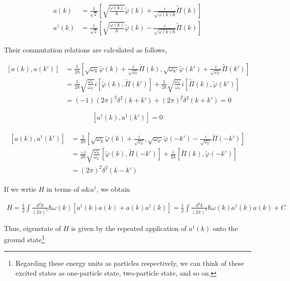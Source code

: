 \begin{align}\label{1.4.8}
\begin{split}
a(k) &= \frac{1}{\sqrt{2}}\left[\sqrt{\frac{\omega(k)}{\hbar}}\tilde{\varphi}(k)+\frac{i}{\sqrt{\omega(k)\hbar}}\tilde{\Pi}(k)\right]\\
a^\dagger(k) &= \frac{1}{\sqrt{2}}\left[\sqrt{\frac{\omega(k)}{\hbar}}\tilde{\varphi}(k)-\frac{i}{\sqrt{\omega(k)\hbar}}\tilde{\Pi}(k)\right]
\end{split}
\end{align}

Their commutation relations are calculated as follows, 

\[\begin{split}
[a(k),a(k')] &= \frac{1}{2\hbar}\left[\sqrt{\omega_k}\tilde{\varphi}(k)+\frac{i}{\sqrt{\omega_k}} \tilde{\Pi}(k), \sqrt{\omega_{k'}}\tilde{\varphi}(k')+\frac{i}{\sqrt{\omega_{k'}}}\tilde{\Pi}(k')\right] \\
&= \frac{1}{2\hbar}\sqrt{\frac{\omega_k}{\omega_{k'}}}i[\tilde{\varphi}(k),\tilde{\Pi}(k')] + \frac{1}{2\hbar}\sqrt{\frac{\omega_{k'}}{\omega_k}}i[\tilde{\Pi}(k),\tilde{\varphi}(k')] \\
&=(-1)(2\pi)^2\delta^2(k+k')+(2\pi)^2\delta^2(k+k')= 0 
\end{split}\]

\[[a^\dagger(k),a^\dagger(k')] = 0 \]

\begin{align}\begin{split}
[a(k),a^\dagger(k')] &= \frac{1}{2\hbar}\left[\sqrt{\omega_k}\tilde{\varphi}(k)+\frac{i}{\sqrt{\omega_k}}, \sqrt{\omega_{k'}}\tilde{\varphi}(-k') - \frac{i}{\sqrt{\omega_{k'}}}\tilde{\Pi}(-k')\right] \\
&= \frac{-i}{2\hbar}\sqrt{\frac{\omega_k}{\omega_{k'}}} [\tilde{\varphi}(k),\tilde{\Pi}(-k')] + \frac{i}{2\hbar}[\tilde{\Pi}(k),\tilde{\varphi}(-k')] \\
&= (2\pi)^2\delta^2(k-k')
\end{split}\end{align}

If we wrtie $H$ in terms of $a \& a^\dagger$, we obtain

\begin{align}
H = \frac{1}{2}\int \frac{d^2 k}{(2\pi)^2}\hbar\omega(k)[a^\dagger(k)a(k)+a(k)a^\dagger(k)] = \frac{1}{2}\int \frac{d^2 k}{(2\pi)^2}\hbar\omega(k)a^\dagger(k)a(k)+C
\end{align}

Thus, eigenstate of $H$ is given by the repeated application of $a^\dagger(k)$ onto the ground state\footnote{Regarding these energy units as particles respectively, we can think of these excited states as one-particle state, two-particle state, and so on. }

